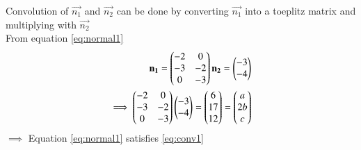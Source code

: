 \documentclass[journal,12pt,twocolumn]{IEEEtran}
\begin{document}
Convolution of $\vec{n_1}$ and $\vec{n_2}$ can be done by converting $\vec{n_1}$ into a toeplitz matrix and multiplying with $\vec{n_2}$\\
From equation \eqref{eq:normal1}
\begin{align}
    \mathbf{n_1}=\begin{pmatrix}-2&0\\-3&-2\\0&-3\end{pmatrix}
    \mathbf{n_2}=\begin{pmatrix}-3\\ -4\end{pmatrix}\label{eq:conv2}\\
\implies \begin{pmatrix}-2&0\\-3&-2\\0&-3\end{pmatrix}\begin{pmatrix}-3\\ -4\end{pmatrix} = \begin{pmatrix}6\\17\\12\end{pmatrix} = \begin{pmatrix}a\\2b\\c\end{pmatrix}\label{eq:conv3}
\end{align}
$\implies$ Equation \eqref{eq:normal1} satisfies \eqref{eq:conv1}\\
\end{document}
